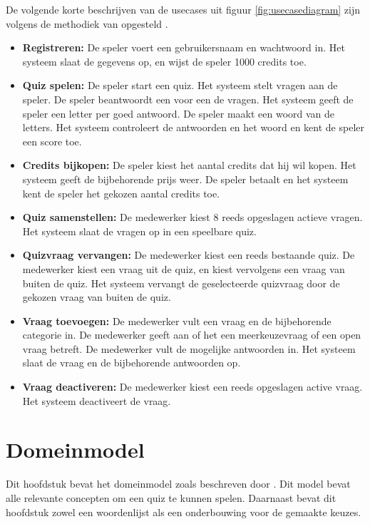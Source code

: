 \noindent\begin{minipage}{\textwidth}
   De volgende korte beschrijven van de usecases uit figuur \ref{fig:usecasediagram} zijn volgens de methodiek van \textcite{larman} opgesteld .
   \begin{itemize}
      \item \textbf{Registreren:} De speler voert een gebruikersnaam en wachtwoord in. Het systeem slaat de gegevens op, en wijst de speler 1000 credits toe.
      \item \textbf{Quiz spelen:} De speler start een quiz. Het systeem stelt vragen aan de speler. De speler beantwoordt een voor een de vragen. Het systeem geeft de speler een letter per goed antwoord. De speler maakt een woord van de letters. Het systeem controleert de antwoorden en het woord en kent de speler een score toe.
      \item \textbf{Credits bijkopen:} De speler kiest het aantal credits dat hij wil kopen. Het systeem geeft de bijbehorende prijs weer. De speler betaalt en het systeem kent de speler het gekozen aantal credits toe.
      \item \textbf{Quiz samenstellen:} De medewerker kiest 8 reeds opgeslagen actieve vragen. Het systeem slaat de vragen op in een speelbare quiz.
      \item \textbf{Quizvraag vervangen:} De medewerker kiest een reeds bestaande quiz. De medewerker kiest een vraag uit de quiz, en kiest vervolgens een vraag van buiten de quiz. Het systeem vervangt de geselecteerde quizvraag door de gekozen vraag van buiten de quiz.
      \item \textbf{Vraag toevoegen:} De medewerker vult een vraag en de bijbehorende categorie in. De medewerker geeft aan of het een meerkeuzevraag of een open vraag betreft. De medewerker vult de mogelijke antwoorden in. Het systeem slaat de vraag en de bijbehorende antwoorden op.
      \item \textbf{Vraag deactiveren:} De medewerker kiest een reeds opgeslagen active vraag. Het systeem deactiveert de vraag.
   \end{itemize}
\end{minipage}

\clearpage\section{Domeinmodel}
Dit hoofdstuk bevat het domeinmodel zoals beschreven door \textcite[127]{larman}. Dit model bevat alle relevante concepten om een quiz te kunnen spelen. Daarnaast bevat dit hoofdstuk zowel een woordenlijst als een onderbouwing voor de gemaakte keuzes.

